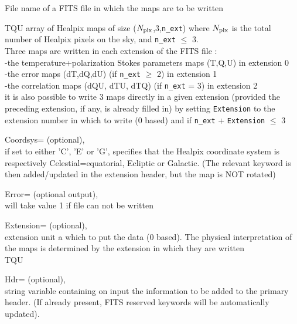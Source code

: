 \begin{qualifiers}
  \begin{qulist}{} %
 	\item[{File}] 
          name of a FITS file in which the maps are to be written

   \item[{TQU}] array of Healpix maps of size ($N_{\rm pix}$,3,{\tt n\_ext}) where $N_{\rm pix}$ is the total
   number of Healpix pixels on the sky, and {\tt n\_ext} $\le$ 3.\\
     Three maps are written in each extension of the FITS file : \\
      -the temperature+polarization Stokes parameters maps (T,Q,U) in
   extension 0 \\
      -the error maps (dT,dQ,dU) (if {\tt n\_ext} $\ge$ 2) in extension 1 \\
      -the correlation maps (dQU, dTU, dTQ) (if {\tt n\_ext} = 3) in extension 2
\\
     it is also possible to write 3 maps directly in a given
     extension (provided the preceding extension, if any, is already
     filled in)
     by setting {\tt Extension} to the extension number in which to write
     (0 based) and if {\tt n\_ext} + {\tt Extension} $\le$ 3

       \item[{Coordsys=}]
		  (optional), \\
		if set to either 'C', 'E' or 'G',  specifies that the
		Healpix coordinate system is respectively Celestial=equatorial,
		  Ecliptic or Galactic.
		(The relevant keyword is then added/updated in the extension
		  header, but the map is NOT rotated)

	\item[{Error=}]
		(optional output), \\
		will take value 1 if file can not be written


       \item[{Extension=}]
		(optional), \\
	extension unit a which to put the data (0 based). The physical
		interpretation of the maps is determined by the
		extension in which they are written\\
	\seealso TQU

       \item[{Hdr=}]
		  (optional), \\
		string variable containing on input  the information to be added
		  to the primary header. (If already present, FITS reserved
		  keywords will be automatically updated).


\end{qulist}
\end{qualifiers}
